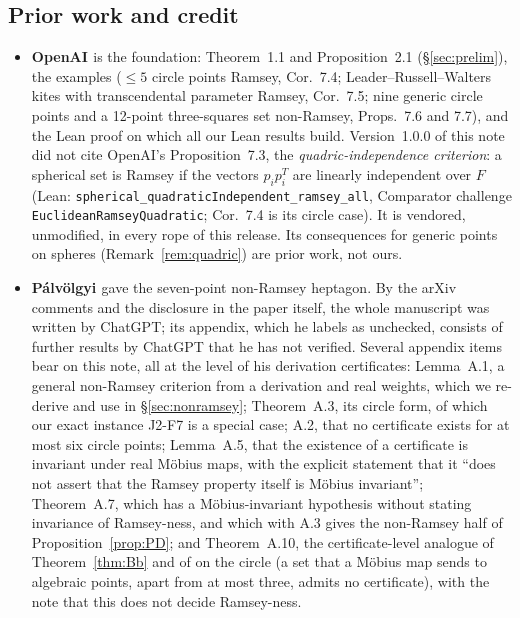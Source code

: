 \documentclass[11pt]{amsart}
\theoremstyle{plain}
\theoremstyle{definition}
\begin{document}
\subsection{Prior work and credit}\label{sec:credit}

\begin{itemize}
\item \textbf{OpenAI \cite{OAI172}} is the foundation: Theorem~1.1 and Proposition~2.1
(\S\ref{sec:prelim}), the examples ($\le5$ circle points Ramsey, Cor.~7.4; Leader--Russell--Walters
kites with transcendental parameter Ramsey, Cor.~7.5; nine generic circle points and a 12-point
three-squares set non-Ramsey, Props.~7.6 and 7.7), and the Lean proof on which all our Lean results
build. Version~1.0.0 of this note did not cite OpenAI's Proposition~7.3, the
\emph{quadric-independence criterion}: a spherical set is Ramsey if the vectors $p_ip_i^T$ are
linearly independent over $F$ (Lean: \texttt{spherical\_\allowbreak{}quadraticIndependent\_\allowbreak{}ramsey\_\allowbreak{}all}, Comparator
challenge \texttt{EuclideanRamseyQuadratic}; Cor.~7.4 is its circle case). It is vendored, unmodified,
in every rope of this release. Its consequences for generic points on spheres
(Remark~\ref{rem:quadric}) are prior work, not ours.
\item \textbf{P\'alv\"olgyi \cite{Palvolgyi}} gave the seven-point non-Ramsey heptagon. By the arXiv
comments and the disclosure in the paper itself, the whole manuscript was written by ChatGPT; its
appendix, which he labels as unchecked, consists of further results by ChatGPT that he has not
verified. Several appendix items bear on this note, all at the level of his derivation
certificates: Lemma~A.1, a general non-Ramsey criterion from a derivation and real weights, which we
re-derive and use in \S\ref{sec:nonramsey}; Theorem~A.3, its circle form, of which our exact
instance J2-F7 is a special case; A.2, that no certificate exists for at most six circle
points; Lemma~A.5, that the existence of a certificate is invariant under real M\"obius maps, with
the explicit statement that it ``does not assert that the Ramsey property itself is M\"obius
invariant''; Theorem~A.7, which has a M\"obius-invariant hypothesis without stating invariance of
Ramsey-ness, and which with A.3 gives the non-Ramsey half of Proposition~\ref{prop:PD}; and Theorem~A.10, the certificate-level analogue of Theorem~\ref{thm:Bb} and of
\cite[Cor.~1(c)]{MR} on the circle (a set that a M\"obius map sends to algebraic points, apart from at
most three, admits no certificate), with the note that this does not decide Ramsey-ness.

\end{itemize}
\end{document}
